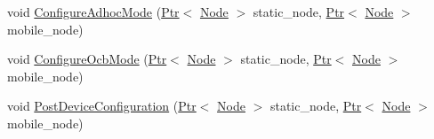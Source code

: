 \begin{DoxyCompactItemize}
\item 
void \hyperlink{classOcbWifiMacTestCase_ab3c7899bb00af1e0ad1897f9ae74cdd0}{Configure\+Adhoc\+Mode} (\hyperlink{classns3_1_1Ptr}{Ptr}$<$ \hyperlink{classns3_1_1Node}{Node} $>$ static\+\_\+node, \hyperlink{classns3_1_1Ptr}{Ptr}$<$ \hyperlink{classns3_1_1Node}{Node} $>$ mobile\+\_\+node)
\item 
void \hyperlink{classOcbWifiMacTestCase_add1a92f13aa427098d671fb52200f2d6}{Configure\+Ocb\+Mode} (\hyperlink{classns3_1_1Ptr}{Ptr}$<$ \hyperlink{classns3_1_1Node}{Node} $>$ static\+\_\+node, \hyperlink{classns3_1_1Ptr}{Ptr}$<$ \hyperlink{classns3_1_1Node}{Node} $>$ mobile\+\_\+node)
\item 
void \hyperlink{classOcbWifiMacTestCase_a6b536e2fc476ebf85d4cd0ae7490987c}{Post\+Device\+Configuration} (\hyperlink{classns3_1_1Ptr}{Ptr}$<$ \hyperlink{classns3_1_1Node}{Node} $>$ static\+\_\+node, \hyperlink{classns3_1_1Ptr}{Ptr}$<$ \hyperlink{classns3_1_1Node}{Node} $>$ mobile\+\_\+node)
\end{DoxyCompactItemize}
